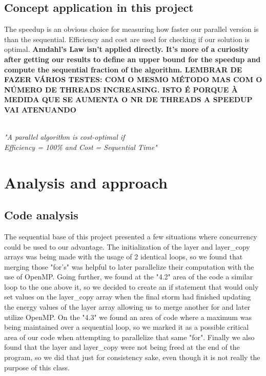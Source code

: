 \documentclass[10pt,journal,compsoc]{IEEEtran}
\begin{document}
\subsection{Concept application in this project}
The speedup is an obvious choice for measuring how faster our parallel version is than the sequential. Efficiency and cost are used for checking if our solution is optimal. \textbf{Amdahl's Law isn't applied directly. It's more of a curiosity after getting our results to define an upper bound for the speedup and compute the sequential fraction of the algorithm. LEMBRAR DE FAZER VÁRIOS TESTES: COM O MESMO MÉTODO MAS COM O NÚMERO DE THREADS INCREASING. ISTO É PORQUE À MEDIDA QUE SE AUMENTA O NR DE THREADS A SPEEDUP VAI ATENUANDO} 
\begin{center}
\textit{\\"A parallel algorithm is cost-optimal if\\ Efficiency = 100\% and Cost = Sequential Time"}
\end{center}

\section{Analysis and approach}

\subsection{Code analysis}

The sequential base of this project presented a few situations where concurrency could be used to our advantage. The initialization of the layer and layer\_copy arrays was being made with the usage of 2 identical loops, so we found that merging those "for's" was helpful to later parallelize their computation with the use of OpenMP. Going further, we found at the "4.2" area of the code a similar loop to the one above it, so we decided to create an if statement that would only set values on the layer\_copy array when the final storm had finished updating the energy values of the layer array allowing us to merge another for and later utilize OpenMP. On the "4.3" we found an area of code where a maximum was being maintained over a sequential loop, so we marked it as a possible critical area of our code when attempting to parallelize that same "for". Finally we also found that the layer and layer\_copy were not being freed at the end of the program, so we did that just for consistency sake, even though it is not really the purpose of this class.
\end{document}
